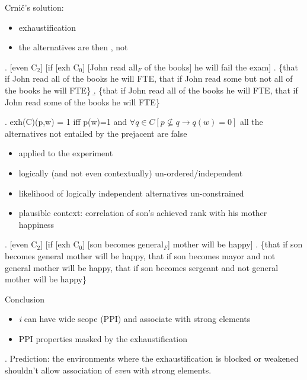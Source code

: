 \documentclass[ignorenonframetext,]{beamer}
\providecommand{\tightlist}{%
  \setlength{\itemsep}{0pt}\setlength{\parskip}{0pt}}
\begin{document}
\begin{frame}

Crnič's solution:

\begin{itemize}
\tightlist
\item
  exhaustification
\item
  the alternatives are then \Next[a], not \Next[b]
\end{itemize}

\ex. {[}even C\(_2\){]} {[}if {[}exh C\(_0\){]} {[}John read all\(_F\)
of the books{]} he will fail the exam{]} \a. \{that if John read all of
the books he will FTE, that if John read some but not all of the books
he will FTE\} \b. \{that if John read all of the books he will FTE, that
if John read some of the books he will FTE\}

\ex. exh(C)(p,w) = 1 iff p(w)=1 and
\(\forall q\in C[p \not\subseteq q \rightarrow q(w) = 0]\)\newline
all the alternatives not entailed by the prejacent are false

\end{frame}

\begin{frame}

\begin{itemize}
\tightlist
\item
  applied to the experiment
\item
  logically (and not even contextually) un-ordered/independent
\item
  likelihood of logically independent alternatives un-constrained
\item
  plausible context: correlation of son's achieved rank with his mother
  happiness
\end{itemize}

\ex. {[}even C\(_2\){]} {[}if {[}exh C\(_0\){]} {[}son becomes
general\(_F\){]} mother will be happy{]} \a. \{that if son becomes
general mother will be happy, that if son becomes mayor and not general
mother will be happy, that if son becomes sergeant and not general
mother will be happy\}

\end{frame}

\begin{frame}

Conclusion

\begin{itemize}
\tightlist
\item
  \emph{i} can have wide scope (PPI) and associate with strong elements
\item
  PPI properties masked by the exhaustification
\end{itemize}

\ex. Prediction: the environments where the exhaustification is blocked
or weakened shouldn't allow association of \emph{even} with strong
elements.


\end{frame}
\end{document}
